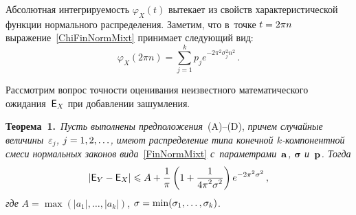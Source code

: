 \begin{multicols}{2}
Абсолютная интегрируемость  $\varphi_X(t)$ вытекает из свойств 
характеристической функции нормального распределения. 
Заметим, что в~точке $t\hm=2\pi n$ выражение~\eqref{ChiFinNormMixt} принимает 
сле\-ду\-ющий вид:
\begin{equation}
\label{ChiFinNormMixt2npi}
\varphi_X(2\pi n)= \sum\limits_{j=1}^{k}p_j e^{-2\pi^2 \sigma_j^2 n^2}\,.
\end{equation}

Рассмотрим вопрос точности оценивания неизвестного математического ожидания~${\sf E}_X$ 
при до\-бав\-ле\-нии зашумления.

\smallskip

\noindent
\textbf{Теорема~1.}\ 
\textit{Пусть выполнены предположения}~(A)--(D), 
\textit{причем случайные величины~$\varepsilon_j$, $j\hm=1,2,\ldots$, 
имеют распределение типа конечной $k$-ком\-по\-нент\-ной смеси нормальных законов 
вида}~\eqref{FinNormMixt} \textit{с~па\-ра\-мет\-ра\-ми~${\bf a}$, $\boldsymbol{\sigma}$ 
и~${\bf p}$. Тогда}
\begin{equation}
\label{Th1Eq}
\left\lvert {\sf E}_Y-{\sf E}_X\right\rvert \leqslant 
A+\displaystyle\frac{\displaystyle 1\mathstrut}{\displaystyle \pi\mathstrut}\left(1+\displaystyle\frac{\displaystyle 1\mathstrut}{\displaystyle 4\pi^2\sigma^2\mathstrut}\right)e^{-2\pi^2\sigma^2}\,, 
\end{equation}
\textit{где} $A=\max(|a_1|,\ldots,|a_k|)$, $\sigma\hm=\min(\sigma_1,\ldots,\sigma_k)$.

\smallskip



\end{multicols}
